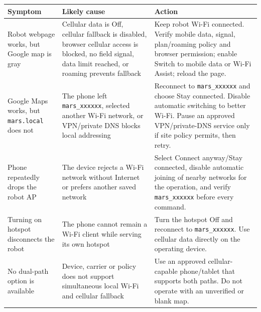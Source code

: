 \documentclass[
  10pt,
  letterpaper,
  openany]{report}
\newcounter{none} %
\begin{document}
{\def\LTcaptype{none} %
\begin{longtable}[]{@{}
  >{\raggedright\arraybackslash}p{}
  >{\raggedright\arraybackslash}p{}
  >{\raggedright\arraybackslash}p{}@{}}
\toprule\noalign{}
\begin{minipage}[b]{\linewidth}\raggedright
Symptom
\end{minipage} & \begin{minipage}[b]{\linewidth}\raggedright
Likely cause
\end{minipage} & \begin{minipage}[b]{\linewidth}\raggedright
Action
\end{minipage} \\
\midrule\noalign{}
\endhead
\bottomrule\noalign{}
\endlastfoot
Robot webpage works, but Google map is gray & Cellular data is Off,
cellular fallback is disabled, browser cellular access is blocked, no
field signal, data limit reached, or roaming prevents fallback & Keep
robot Wi-Fi connected. Verify mobile data, signal, plan/roaming policy
and browser permission; enable Switch to mobile data or Wi-Fi Assist;
reload the page. \\
Google Maps works, but \texttt{mars.local} does not & The phone left
\texttt{mars\_xxxxxx}, selected another Wi-Fi network, or VPN/private
DNS blocks local addressing & Reconnect to \texttt{mars\_xxxxxx} and
choose Stay connected. Disable automatic switching to better Wi-Fi.
Pause an approved VPN/private-DNS service only if site policy permits,
then retry. \\
Phone repeatedly drops the robot AP & The device rejects a Wi-Fi network
without Internet or prefers another saved network & Select Connect
anyway/Stay connected, disable automatic joining of nearby networks for
the operation, and verify \texttt{mars\_xxxxxx} before every command. \\
Turning on hotspot disconnects the robot & The phone cannot remain a
Wi-Fi client while serving its own hotspot & Turn the hotspot Off and
reconnect to \texttt{mars\_xxxxxx}. Use cellular data directly on the
operating device. \\
No dual-path option is available & Device, carrier or policy does not
support simultaneous local Wi-Fi and cellular fallback & Use an approved
cellular-capable phone/tablet that supports both paths. Do not operate
with an unverified or blank map. \\
\end{longtable}
}
\end{document}
